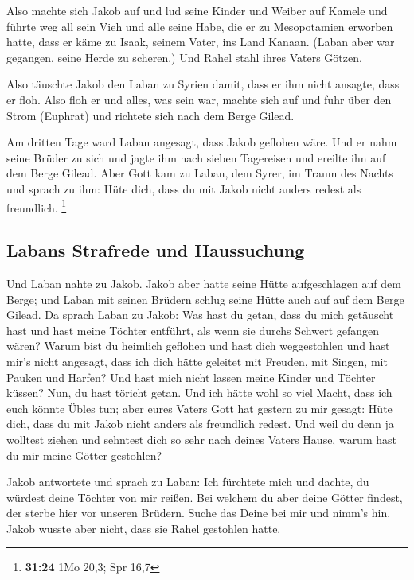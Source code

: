  Also machte sich Jakob auf und lud seine Kinder und
Weiber auf Kamele  und führte weg all sein Vieh und alle
seine Habe, die er zu Mesopotamien erworben hatte, dass er käme zu
Isaak, seinem Vater, ins Land Kanaan.  (Laban aber war
gegangen, seine Herde zu scheren.) Und Rahel stahl ihres Vaters Götzen.

 Also täuschte Jakob den Laban zu Syrien damit, dass er
ihm nicht ansagte, dass er floh.  Also floh er und alles,
was sein war, machte sich auf und fuhr über den Strom (Euphrat) und
richtete sich nach dem Berge Gilead.

 Am dritten Tage ward Laban angesagt, dass Jakob geflohen
wäre.  Und er nahm seine Brüder zu sich und jagte ihm
nach sieben Tagereisen und ereilte ihn auf dem Berge Gilead.
 Aber Gott kam zu Laban, dem Syrer, im Traum des Nachts
und sprach zu ihm: Hüte dich, dass du mit Jakob nicht anders redest als
freundlich. \footnote{\textbf{31:24} 1Mo 20,3; Spr 16,7}

\hypertarget{labans-strafrede-und-haussuchung}{%
\subsection{Labans Strafrede und
Haussuchung}\label{labans-strafrede-und-haussuchung}}

 Und Laban nahte zu Jakob. Jakob aber hatte seine Hütte
aufgeschlagen auf dem Berge; und Laban mit seinen Brüdern schlug seine
Hütte auch auf auf dem Berge Gilead.  Da sprach Laban zu
Jakob: Was hast du getan, dass du mich getäuscht hast und hast meine
Töchter entführt, als wenn sie durchs Schwert gefangen wären?
 Warum bist du heimlich geflohen und hast dich
weggestohlen und hast mir's nicht angesagt, dass ich dich hätte geleitet
mit Freuden, mit Singen, mit Pauken und Harfen?  Und hast
mich nicht lassen meine Kinder und Töchter küssen? Nun, du hast töricht
getan.  Und ich hätte wohl so viel Macht, dass ich euch
könnte Übles tun; aber eures Vaters Gott hat gestern zu mir gesagt: Hüte
dich, dass du mit Jakob nicht anders als freundlich redest.
 Und weil du denn ja wolltest ziehen und sehntest dich so
sehr nach deines Vaters Hause, warum hast du mir meine Götter gestohlen?

 Jakob antwortete und sprach zu Laban: Ich fürchtete mich
und dachte, du würdest deine Töchter von mir reißen.  Bei
welchem du aber deine Götter findest, der sterbe hier vor unseren
Brüdern. Suche das Deine bei mir und nimm's hin. Jakob wusste aber
nicht, dass sie Rahel gestohlen hatte.

